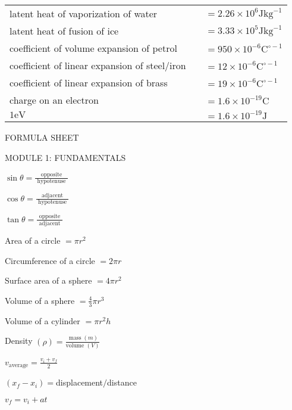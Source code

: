 \documentclass{extarticle}
\begin{document}
\begin{tabularx}{\textwidth}{Xr@{}l}
latent heat of vaporization of water & & $=2.26 \times 10^{6} \mathrm{J} \mathrm{kg}^{-1}$ \\

latent heat of fusion of ice & & $=3.33 \times 10^{5} \mathrm{J} \mathrm{kg}^{-1}$ \\

coefficient of volume expansion of petrol & & $=950 \times 10^{-6} \mathrm{C}^{\circ-1}$ \\

coefficient of linear expansion of steel/iron & & $=12 \times 10^{-6} \mathrm{C}^{\circ-1}$ \\

coefficient of linear expansion of brass & & $=19 \times 10^{-6} \mathrm{C}^{\circ-1}$ \\

charge on an electron & & $=1.6 \times 10^{-19} \mathrm{C}$ \\

$1 \mathrm{eV}$ & & $=1.6 \times 10^{-19} \mathrm{J}$ \\

\end{tabularx}


\markEnd

\markStart[25]


FORMULA SHEET

MODULE 1: FUNDAMENTALS

$\sin \theta=\frac{\text { opposite }}{\text { hypotenuse }}$

$\cos \theta=\frac{\text { adjacent }}{\text { hypotenuse }}$

$\tan \theta=\frac{\text { opposite }}{\text { adjacent }}$

\markEnd

\markStart[100]


Area of a circle $=\pi r^{2}$

Circumference of a circle $=2 \pi r$

Surface area of a sphere $=4 \pi r^{2} \quad$

Volume of a sphere $=\frac{4}{3} \pi r^{3}$

Volume of a cylinder $=\pi r^{2} h \quad$

Density $(\rho)=\frac{\operatorname{mass}(m)}{\text {volume }(V)}$

$v_{\text {average}}=\frac{v_{i}+v_{f}}{2}$

$\left(x_{f}-x_{i}\right)=$displacement$/$distance

$v_{f}=v_{i}+a t$
\end{document}
